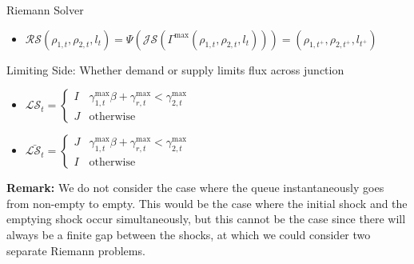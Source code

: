 Riemann Solver
\begin{itemize}
\item $\mathcal{RS}\left(\rho_{1,t},\rho_{2,t},l_{t}\right)=\Psi\left(\mathcal{JS}\left(\Gamma^{\max}\left(\rho_{1,t},\rho_{2,t},l_{t}\right)\right)\right)=\left(\rho_{1,t^{+}},\rho_{2,t^{+}},l_{t^{+}}\right)$
\end{itemize}
Limiting Side: Whether demand or supply limits flux across junction
\begin{itemize}
\item $\mathcal{LS}_{t}=\begin{cases}
I & \gamma_{1,t}^{\max}\beta+\gamma_{r,t}^{\max}<\gamma_{2,t}^{\max}\\
J & \text{otherwise}
\end{cases}$
\item $\bar{\mathcal{LS}_{t}}=\begin{cases}
J & \gamma_{1,t}^{\max}\beta+\gamma_{r,t}^{\max}<\gamma_{2,t}^{\max}\\
I & \text{otherwise}
\end{cases}$
\end{itemize}
\textbf{Remark:} We do not consider the case where the queue instantaneously
goes from non-empty to empty. This would be the case where the initial shock and the emptying shock occur simultaneously, but this cannot be the case since there will always be a finite gap between the shocks, at which we could consider two separate Riemann problems.


